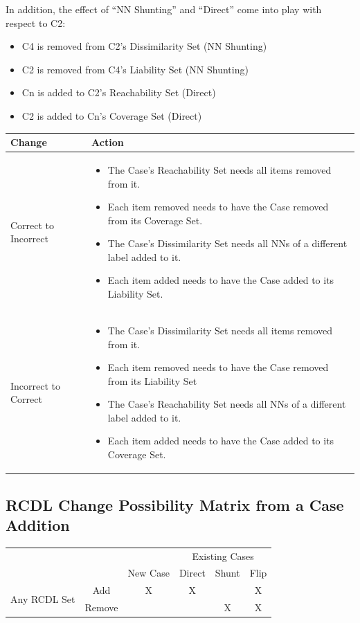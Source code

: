 \documentclass[a4paper,11pt]{report}
\begin{document}
In addition, the effect of ``NN Shunting'' and ``Direct'' come into play with respect to C2:
\begin{itemize}
	\item C4 is removed from C2's Dissimilarity Set (NN Shunting)
	\item C2 is removed from C4's Liability Set (NN Shunting)
	\item Cn is added to C2's Reachability Set (Direct)
	\item C2 is added to Cn's Coverage Set (Direct)
\end{itemize}

\begin{tabular}{|x{55pt}|x{355pt}|}
\hline 
Change & Action \tabularnewline 
\hline 
Correct to Incorrect & 
\begin{itemize}
	\item The Case's Reachability Set needs all items removed from it.
	\item Each item removed needs to have the Case removed from its Coverage Set.
	\item The Case's Dissimilarity Set needs all NNs of a different label added to it.
	\item Each item added needs to have the Case added to its Liability Set.
\end{itemize} \tabularnewline 
\hline 
Incorrect to Correct & 
\begin{itemize}
	\item The Case's Dissimilarity Set needs all items removed from it.
	\item Each item removed needs to have the Case removed from its Liability Set
	\item The Case's Reachability Set needs all NNs of a different label added to it.
	\item Each item added needs to have the Case added to its Coverage Set.
\end{itemize} \tabularnewline 
\hline 
\end{tabular}	

\subsection{RCDL Change Possibility Matrix from a Case Addition\label{sec:rcdlchangematrix}}
\begin{tabular}{|c|c|c|c|c|c|}
\cline{4-6} 
\multicolumn{1}{c}{} & \multicolumn{1}{c}{} &  & \multicolumn{3}{c|}{Existing Cases}\tabularnewline
\cline{3-6} 
\multicolumn{1}{c}{} &  & New Case & Direct & Shunt & Flip\tabularnewline
\hline
\multirow{2}{*}{Any RCDL Set} & Add & X & X &  & X\tabularnewline
\cline{2-6} 
 & Remove &  &  & X & X\tabularnewline
\hline 
\end{tabular}
	
\end{document}
